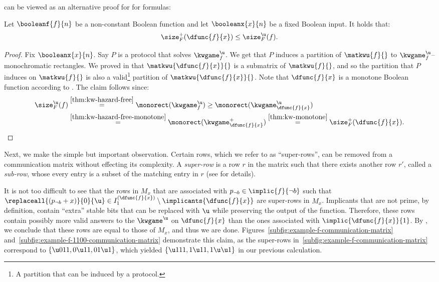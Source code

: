 \documentclass[acmsmall, nonacm, authorversion]{acmart}
\begin{document}
 can be viewed as an alternative proof for  for formulas:

\begin{corollary}\label{cor:derivative-lower-bound}
Let $\booleanf{f}{n}$ be a non-constant Boolean function and let $\booleanx{x}{n}$ be a fixed Boolean input. It holds that:
\[
\size_{F}^{+}(\dfunc{f}{x})\le \size_{F}^{\u}(f).
\]
\end{corollary}
\begin{proof}
Fix $\booleanx{x}{n}$. Say $P$ is a protocol that solves $\kwgame_{f}^{\u}$. 
We get that $P$ induces a partition of $\matkwu{f}{}$ to $\kwgame_{f}^{\u}$--monochromatic rectangles. We proved in  that $\matkwu{\dfunc{f}{x}}{}$ is a submatrix of $\matkwu{f}{}$, and so the partition that $P$ induces on $\matkwu{f}{}$ is also a valid\footnote{A partition that can be induced by a protocol.} partition of $\matkwu{\dfunc{f}{x}}{}$. Note that $\dfunc{f}{x}$ is a monotone Boolean function according to . The claim follows since:
\begin{align}\label{eq:relating-size}
  \size_{F}^{\u}(f) & \stackrel{\Cref{thm:kw-hazard-free}}{=}\monorect(\kwgame_{f}^{\u}) \geq \monorect(\kwgame_{\dfunc{f}{x}}^{\u}) \\
   & \stackrel{\Cref{thm:kw-hazard-free-monotone}}{=} \monorect(\kwgame_{\dfunc{f}{x}}^{+})\stackrel{\Cref{thm:kw-monotone}}{=}\size_{F}^{+}(\dfunc{f}{x}).\qedhere
\end{align}
\end{proof}

Next, we make the simple but important observation. Certain rows, which we refer to as ``super-rows'', can be removed from a communication matrix without effecting its complexity. A \emph{super-row} is a row $r$ in the matrix such that there exists another row $r'$, called a \emph{sub-row}, whose every entry is a subset of the matching entry in $r$ (see  for details). 

It is not too difficult to see that the rows in $M_x$ that are associated with $p_{\neg b}\in \implic{f}{\neg b}$ such that $\replaceall{(p_{\neg b}+x)}{0}{\u}\in I_1^{(\dfunc{f}{x})}\setminus \implicants{\dfunc{f}{x}}$ are super-rows in $M_x$. Implicants that are not prime, by definition, contain ``extra'' stable bits that can be replaced with $\u$ while preserving the output of the function. Therefore, these rows contain possibly more valid answers to the $\kwgame^\u$ on $\dfunc{f}{x}$ than the ones associated with $\implic{\dfunc{f}{x}}{1}$. By , we conclude that these rows are equal to those of $M_x$, and thus we are done. Figures~\ref{subfig:example-f-communication-matrix} and~\ref{subfig:example-f-1100-communication-matrix} demonstrate this claim, as the super-rows in~\ref{subfig:example-f-communication-matrix} correspond to $\{\u 011, 0\u11,01\u1\}$, which yielded $\{\u 111, 1\u 11, 1\u\u1\}$ in our previous calculation.
\end{document}
